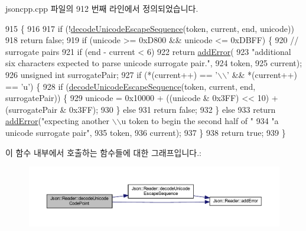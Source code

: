 jsoncpp.\+cpp 파일의 912 번째 라인에서 정의되었습니다.


\begin{DoxyCode}
915                                                            \{
916 
917   \textcolor{keywordflow}{if} (!\hyperlink{class_json_1_1_reader_a469cb6f55971d7c41fca2752a3aa5bf7}{decodeUnicodeEscapeSequence}(token, current, end, unicode))
918     \textcolor{keywordflow}{return} \textcolor{keyword}{false};
919   \textcolor{keywordflow}{if} (unicode >= 0xD800 && unicode <= 0xDBFF) \{
920     \textcolor{comment}{// surrogate pairs}
921     \textcolor{keywordflow}{if} (end - current < 6)
922       \textcolor{keywordflow}{return} \hyperlink{class_json_1_1_reader_af02176a1d2786b4415bbb00a1b10bb6b}{addError}(
923           \textcolor{stringliteral}{"additional six characters expected to parse unicode surrogate pair."},
924           token,
925           current);
926     \textcolor{keywordtype}{unsigned} \textcolor{keywordtype}{int} surrogatePair;
927     \textcolor{keywordflow}{if} (*(current++) == \textcolor{charliteral}{'\(\backslash\)\(\backslash\)'} && *(current++) == \textcolor{charliteral}{'u'}) \{
928       \textcolor{keywordflow}{if} (\hyperlink{class_json_1_1_reader_a469cb6f55971d7c41fca2752a3aa5bf7}{decodeUnicodeEscapeSequence}(token, current, end, surrogatePair)) \{
929         unicode = 0x10000 + ((unicode & 0x3FF) << 10) + (surrogatePair & 0x3FF);
930       \} \textcolor{keywordflow}{else}
931         \textcolor{keywordflow}{return} \textcolor{keyword}{false};
932     \} \textcolor{keywordflow}{else}
933       \textcolor{keywordflow}{return} \hyperlink{class_json_1_1_reader_af02176a1d2786b4415bbb00a1b10bb6b}{addError}(\textcolor{stringliteral}{"expecting another \(\backslash\)\(\backslash\)u token to begin the second half of "}
934                       \textcolor{stringliteral}{"a unicode surrogate pair"},
935                       token,
936                       current);
937   \}
938   \textcolor{keywordflow}{return} \textcolor{keyword}{true};
939 \}
\end{DoxyCode}
이 함수 내부에서 호출하는 함수들에 대한 그래프입니다.\+:\nopagebreak
\begin{figure}[H]
\begin{center}
\leavevmode
\includegraphics[width=350pt]{class_json_1_1_reader_a8fe24db3e9953aef3d637a56447e795c_cgraph}
\end{center}
\end{figure}
